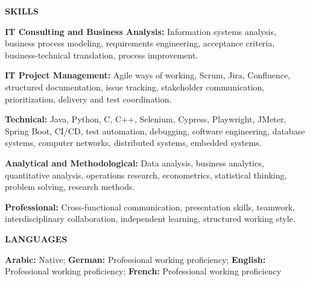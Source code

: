 \documentclass[10pt,a4paper]{article}
\newcommand{\sectiontitle}[1]{%
  \vspace{6pt}%
  \noindent\hspace{1.1em}\colorbox{white}{\bfseries\MakeUppercase{#1}}\par
  \vspace{1pt}%
}
\newenvironment{cvsection}[1]{%
  \Needspace{5\baselineskip}%
  \sectiontitle{#1}%
  \begin{lrbox}{\cvsectionbox}%
    \begin{minipage}{\dimexpr\textwidth-2\fboxsep-2\fboxrule-4pt\relax}%
    \vspace{2pt}
}{%
    \vspace{2pt}
    \end{minipage}%
  \end{lrbox}%
  \noindent\fbox{\usebox{\cvsectionbox}}%
  \par
}
\begin{document}
\begin{cvsection}{Skills}
\textbf{IT Consulting and Business Analysis:} Information systems analysis, business process modeling, requirements engineering, acceptance criteria, business-technical translation, process improvement.

\vspace{2pt}
\textbf{IT Project Management:} Agile ways of working, Scrum, Jira, Confluence, structured documentation, issue tracking, stakeholder communication, prioritization, delivery and test coordination.

\vspace{2pt}
\textbf{Technical:} Java, Python, C, C++, Selenium, Cypress, Playwright, JMeter, Spring Boot, CI/CD, test automation, debugging, software engineering, database systems, computer networks, distributed systems, embedded systems.

\vspace{2pt}
\textbf{Analytical and Methodological:} Data analysis, business analytics, quantitative analysis, operations research, econometrics, statistical thinking, problem solving, research methods.

\vspace{2pt}
\textbf{Professional:} Cross-functional communication, presentation skills, teamwork, interdisciplinary collaboration, independent learning, structured working style.
\end{cvsection}

\begin{cvsection}{Languages}
\textbf{Arabic:} Native; \textbf{German:} Professional working proficiency; \textbf{English:} Professional working proficiency; \textbf{French:} Professional working proficiency
\end{cvsection}
\end{document}
